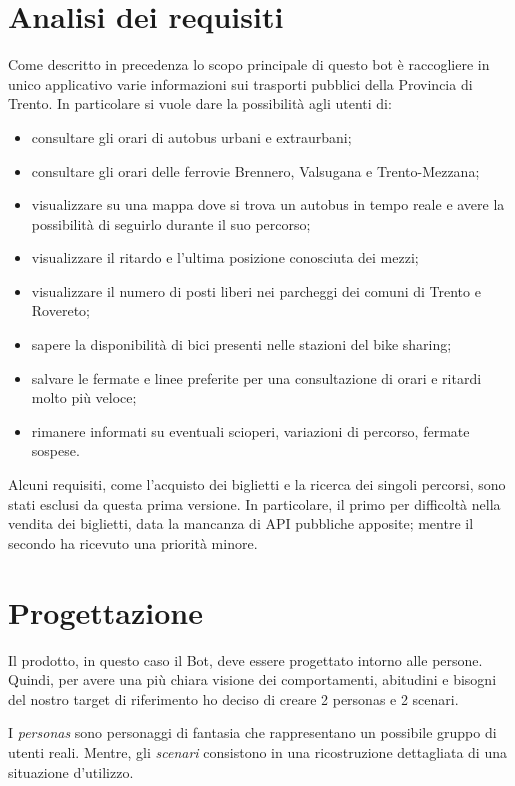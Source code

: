 \pagebreak

\section{Analisi dei requisiti}
\label{sec:requisiti}

Come descritto in precedenza lo scopo principale di questo bot è raccogliere in unico applicativo varie informazioni sui trasporti pubblici della Provincia di Trento. 
In particolare si vuole dare la possibilità agli utenti di:
\begin{itemize}
\item consultare gli orari di autobus urbani e extraurbani;
\item consultare gli orari delle ferrovie Brennero, Valsugana e Trento-Mezzana;
\item visualizzare su una mappa dove si trova un autobus in tempo reale e avere la possibilità di seguirlo durante il suo percorso;
\item visualizzare il ritardo e l'ultima posizione conosciuta dei mezzi;
\item visualizzare il numero di posti liberi nei parcheggi dei comuni di Trento e Rovereto;
\item sapere la disponibilità di bici presenti nelle stazioni del bike sharing;
\item salvare le fermate e linee preferite per una consultazione di orari e ritardi molto più veloce;
\item rimanere informati su eventuali scioperi, variazioni di percorso, fermate sospese.
\end{itemize}

Alcuni requisiti, come l'acquisto dei biglietti e la ricerca dei singoli percorsi, sono stati esclusi da questa prima versione. In particolare, il primo per difficoltà nella vendita dei biglietti, data la mancanza di API pubbliche apposite; mentre il secondo ha ricevuto una priorità minore. 

\section{Progettazione}
\label{sec:progettazione}

Il prodotto, in questo caso il Bot, deve essere progettato intorno alle persone. Quindi, per avere una più chiara visione dei comportamenti, abitudini e bisogni del nostro target di riferimento ho deciso di creare 2 personas e 2 scenari.

I \textit{personas} sono personaggi di fantasia che rappresentano un possibile gruppo di utenti reali. Mentre, gli \textit{scenari} consistono in una ricostruzione dettagliata di una situazione d'utilizzo. 

